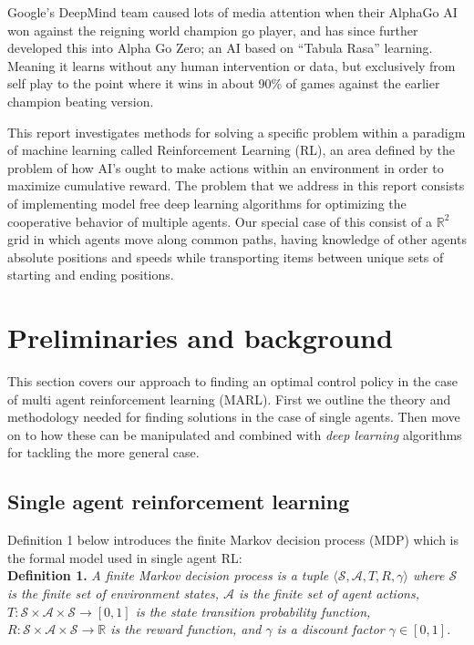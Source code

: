 \documentclass[journal,twoside]{IEEEtran}
\begin{document}
Google’s DeepMind team caused lots of media attention when their AlphaGo AI won against
the reigning world champion go player\cite{website123}, and has since further developed this into Alpha Go Zero; an AI based on “Tabula Rasa” learning. Meaning it learns without any human
intervention or data, but exclusively from self play to the point where it wins in about 90\%\cite{silver} of games against the earlier champion beating version.

This report investigates methods for solving a specific problem
within a paradigm of machine learning called Reinforcement Learning (RL), an area defined by the problem of how AI's ought to make actions within an environment in order to maximize
cumulative reward. The problem that we address in this report consists of implementing model free deep learning algorithms
for optimizing the cooperative behavior of multiple agents. Our special case of this consist of a $\mathbb{R}^2$ grid in which agents move along common paths, having knowledge of other agents absolute positions and speeds while transporting items between unique sets of starting and ending positions.

\section{Preliminaries and background} \label{prelback}

This section covers our approach to finding an optimal control policy in the case of multi agent reinforcement learning (MARL). First we outline the theory and methodology needed for finding solutions in the case of single agents. Then move on to how these can be manipulated and combined with \textit{deep learning} algorithms for tackling the more general case. 

\subsection{Single agent reinforcement learning}

Definition 1 below introduces the finite Markov decision process (MDP) which is the formal model used in single agent RL:\\

\noindent\textbf{Definition 1.} \textit{A finite Markov decision process is a tuple $\langle\mathcal{S,A},T,R,\gamma\rangle$ where $\mathcal{S}$ is the finite set of environment states, $\mathcal{A}$ is the finite set of agent actions, $T:\mathcal{S}\times\mathcal{A}\times\mathcal{S}\rightarrow [0,1]$ is the state transition probability function, $R:\mathcal{S}\times\mathcal{A}\times\mathcal{S}\rightarrow\mathbb{R}$ is the reward function, and $\gamma$ is a discount factor $\gamma\in [0,1]$.}\\
\end{document}
